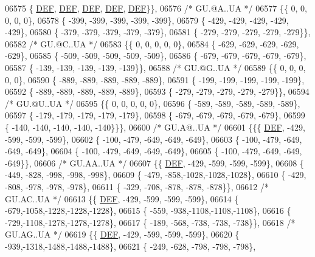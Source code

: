 \begin{DoxyCode}
06575 \{  \mbox{\hyperlink{1_88_84__epars_8h_a397419fc12b37ed479c8abb9d444d843}{DEF}},  \mbox{\hyperlink{1_88_84__epars_8h_a397419fc12b37ed479c8abb9d444d843}{DEF}},  \mbox{\hyperlink{1_88_84__epars_8h_a397419fc12b37ed479c8abb9d444d843}{DEF}},  \mbox{\hyperlink{1_88_84__epars_8h_a397419fc12b37ed479c8abb9d444d843}{DEF}},  \mbox{\hyperlink{1_88_84__epars_8h_a397419fc12b37ed479c8abb9d444d843}{DEF}}\}\},
06576 \textcolor{comment}{/* GU.@A..UA */}
06577 \{\{    0,    0,    0,    0,    0\},
06578 \{ -399, -399, -399, -399, -399\},
06579 \{ -429, -429, -429, -429, -429\},
06580 \{ -379, -379, -379, -379, -379\},
06581 \{ -279, -279, -279, -279, -279\}\},
06582 \textcolor{comment}{/* GU.@C..UA */}
06583 \{\{    0,    0,    0,    0,    0\},
06584 \{ -629, -629, -629, -629, -629\},
06585 \{ -509, -509, -509, -509, -509\},
06586 \{ -679, -679, -679, -679, -679\},
06587 \{ -139, -139, -139, -139, -139\}\},
06588 \textcolor{comment}{/* GU.@G..UA */}
06589 \{\{    0,    0,    0,    0,    0\},
06590 \{ -889, -889, -889, -889, -889\},
06591 \{ -199, -199, -199, -199, -199\},
06592 \{ -889, -889, -889, -889, -889\},
06593 \{ -279, -279, -279, -279, -279\}\},
06594 \textcolor{comment}{/* GU.@U..UA */}
06595 \{\{    0,    0,    0,    0,    0\},
06596 \{ -589, -589, -589, -589, -589\},
06597 \{ -179, -179, -179, -179, -179\},
06598 \{ -679, -679, -679, -679, -679\},
06599 \{ -140, -140, -140, -140, -140\}\}\},
06600 \textcolor{comment}{/* GU.A@..UA */}
06601 \{\{\{  \mbox{\hyperlink{1_88_84__epars_8h_a397419fc12b37ed479c8abb9d444d843}{DEF}}, -429, -599, -599, -599\},
06602 \{ -100, -479, -649, -649, -649\},
06603 \{ -100, -479, -649, -649, -649\},
06604 \{ -100, -479, -649, -649, -649\},
06605 \{ -100, -479, -649, -649, -649\}\},
06606 \textcolor{comment}{/* GU.AA..UA */}
06607 \{\{  \mbox{\hyperlink{1_88_84__epars_8h_a397419fc12b37ed479c8abb9d444d843}{DEF}}, -429, -599, -599, -599\},
06608 \{ -449, -828, -998, -998, -998\},
06609 \{ -479, -858,-1028,-1028,-1028\},
06610 \{ -429, -808, -978, -978, -978\},
06611 \{ -329, -708, -878, -878, -878\}\},
06612 \textcolor{comment}{/* GU.AC..UA */}
06613 \{\{  \mbox{\hyperlink{1_88_84__epars_8h_a397419fc12b37ed479c8abb9d444d843}{DEF}}, -429, -599, -599, -599\},
06614 \{ -679,-1058,-1228,-1228,-1228\},
06615 \{ -559, -938,-1108,-1108,-1108\},
06616 \{ -729,-1108,-1278,-1278,-1278\},
06617 \{ -189, -568, -738, -738, -738\}\},
06618 \textcolor{comment}{/* GU.AG..UA */}
06619 \{\{  \mbox{\hyperlink{1_88_84__epars_8h_a397419fc12b37ed479c8abb9d444d843}{DEF}}, -429, -599, -599, -599\},
06620 \{ -939,-1318,-1488,-1488,-1488\},
06621 \{ -249, -628, -798, -798, -798\},

\end{DoxyCode}
